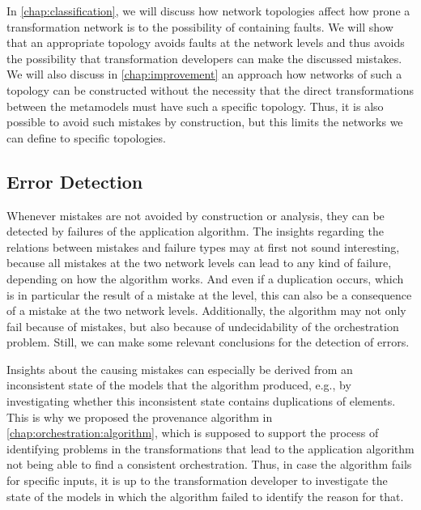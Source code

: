 
In \autoref{chap:classification}, we will discuss how network topologies affect how prone a transformation network is to the possibility of containing faults.
We will show that an appropriate topology avoids faults at the network levels and thus avoids the possibility that transformation developers can make the discussed mistakes.
We will also discuss in \autoref{chap:improvement} an approach how networks of such a topology can be constructed without the necessity that the direct transformations between the metamodels must have such a specific topology.
Thus, it is also possible to avoid such mistakes by construction, but this limits the networks we can define to specific topologies.



\subsection{Error Detection}

Whenever mistakes are not avoided by construction or analysis, they can be detected by failures of the application algorithm.
The insights regarding the relations between mistakes and failure types may at first not sound interesting, because all mistakes at the two network levels can lead to any kind of failure, depending on how the algorithm works.
And even if a duplication occurs, which is in particular the result of a mistake at the \leveltransformation level, this can also be a consequence of a mistake at the two network levels.
Additionally, the algorithm may not only fail because of mistakes, but also because of undecidability of the orchestration problem.
Still, we can make some relevant conclusions for the detection of errors.

Insights about the causing mistakes can especially be derived from an inconsistent state of the models that the algorithm produced, e.g., by investigating whether this inconsistent state contains duplications of elements.
This is why we proposed the provenance algorithm in \autoref{chap:orchestration:algorithm}, which is supposed to support the process of identifying problems in the transformations that lead to the application algorithm not being able to find a consistent orchestration.
Thus, in case the algorithm fails for specific inputs, it is up to the transformation developer to investigate the state of the models in which the algorithm failed to identify the reason for that.

